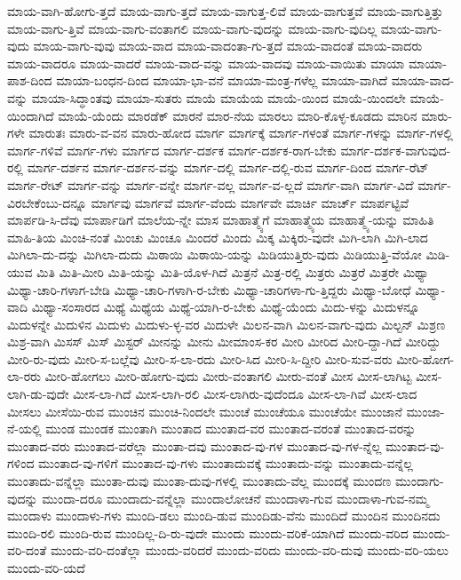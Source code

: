 {ಮಾಯ-ವಾಗಿ-ಹೋಗು-ತ್ತದೆ
ಮಾಯ-ವಾಗು-ತ್ತದೆ
ಮಾಯ-ವಾಗುತ್ತ-ಲಿವೆ
ಮಾಯ-ವಾಗುತ್ತವೆ
ಮಾಯ-ವಾಗುತ್ತಿತ್ತು
ಮಾಯ-ವಾಗು-ತ್ತಿವೆ
ಮಾಯ-ವಾಗು-ವಂತಾಗಲಿ
ಮಾಯ-ವಾಗು-ವುದನ್ನು
ಮಾಯ-ವಾಗು-ವುದಿಲ್ಲ
ಮಾಯ-ವಾಗು-ವುದು
ಮಾಯ-ವಾಗು-ವುವು
ಮಾಯ-ವಾದ
ಮಾಯ-ವಾದಂತಾ-ಗು-ತ್ತದೆ
ಮಾಯ-ವಾದಂತೆ
ಮಾಯ-ವಾದರು
ಮಾಯ-ವಾದರೂ
ಮಾಯ-ವಾದರೆ
ಮಾಯ-ವಾದ-ವನ್ನು
ಮಾಯ-ವಾದವು
ಮಾಯ-ವಾಯಿತು
ಮಾಯಾ
ಮಾಯಾ-ಪಾಶ-ದಿಂದ
ಮಾಯಾ-ಬಂಧನ-ದಿಂದ
ಮಾಯಾ-ಭಾ-ವನೆ
ಮಾಯಾ-ಮಂತ್ರ-ಗಳೆಲ್ಲ
ಮಾಯಾ-ವಾಗಿದೆ
ಮಾಯಾ-ವಾದ-ವನ್ನು
ಮಾಯಾ-ಸಿದ್ಧಾಂತವು
ಮಾಯಾ-ಸುತರು
ಮಾಯೆ
ಮಾಯೆಯ
ಮಾಯೆ-ಯಿಂದ
ಮಾಯೆ-ಯಿಂದಲೇ
ಮಾಯೆ-ಯಿಂದಾಗಿದೆ
ಮಾಯೆ-ಯೆಂದು
ಮಾರಡೆಕ್
ಮಾರನೆ
ಮಾರ-ನೆಯ
ಮಾರಲು
ಮಾರಿ-ಕೊಳ್ಳ-ಕೂಡದು
ಮಾರಿನ
ಮಾರು-ಗಳೇ
ಮಾರುತಃ
ಮಾರು-ವ-ವನ
ಮಾರು-ಹೋದ
ಮಾರ್ಗ
ಮಾರ್ಗಕ್ಕೆ
ಮಾರ್ಗ-ಗಳಂತೆ
ಮಾರ್ಗ-ಗಳನ್ನು
ಮಾರ್ಗ-ಗಳಲ್ಲಿ
ಮಾರ್ಗ-ಗಳಿವೆ
ಮಾರ್ಗ-ಗಳು
ಮಾರ್ಗದ
ಮಾರ್ಗ-ದರ್ಶಕ
ಮಾರ್ಗ-ದರ್ಶಕ-ರಾಗ-ಬೇಕು
ಮಾರ್ಗ-ದರ್ಶಕ-ವಾಗುವುದ-ರಲ್ಲಿ
ಮಾರ್ಗ-ದರ್ಶನ
ಮಾರ್ಗ-ದರ್ಶನ-ವನ್ನು
ಮಾರ್ಗ-ದಲ್ಲಿ
ಮಾರ್ಗ-ದಲ್ಲಿ-ರುವ
ಮಾರ್ಗ-ದಿಂದ
ಮಾರ್ಗ-ರೆಟ್
ಮಾರ್ಗ-ರೇಟ್
ಮಾರ್ಗ-ವನ್ನು
ಮಾರ್ಗ-ವನ್ನೇ
ಮಾರ್ಗ-ವಲ್ಲ
ಮಾರ್ಗ-ವ-ಲ್ಲದೆ
ಮಾರ್ಗ-ವಾಗಿ
ಮಾರ್ಗ-ವಿದೆ
ಮಾರ್ಗ-ವಿರಬೇಕೆಂಬು-ದನ್ನೂ
ಮಾರ್ಗವು
ಮಾರ್ಗವೆ
ಮಾರ್ಗ-ವೆಂದು
ಮಾರ್ಗವೇ
ಮಾರ್ಚಿ
ಮಾರ್ಚ್
ಮಾರ್ಪಟ್ಟಿವೆ
ಮಾರ್ಪಡಿ-ಸಿ-ದೆವು
ಮಾರ್ಪಾಡಿಗೆ
ಮಾಲೆಯ-ನ್ನೇ
ಮಾಸ
ಮಾಹಾತ್ಮ್ಯೆಗೆ
ಮಾಹಾತ್ಮ್ಯೆಯ
ಮಾಹಾತ್ಮ್ಯೆ-ಯನ್ನು
ಮಾಹಿತಿ
ಮಾಹಿ-ತಿಯ
ಮಿಂಚಿ-ನಂತೆ
ಮಿಂಚು
ಮಿಂಚೂ
ಮಿಂದರೆ
ಮಿಂದು
ಮಿಕ್ಕ
ಮಿಕ್ಕಿರು-ವುದೇ
ಮಿಗಿ-ಲಾಗಿ
ಮಿಗಿ-ಲಾದ
ಮಿಗಿಲಾ-ದು-ದನ್ನು
ಮಿಗಿಲಾ-ದುದು
ಮಿಠಾಯಿ
ಮಿಠಾಯಿ-ಯನ್ನು
ಮಿಡಿಯುತ್ತಿರು-ವುದು
ಮಿಡಿಯುತ್ತಿ-ವೆಯೋ
ಮಿಡಿ-ಯುವ
ಮಿತಿ
ಮಿತಿ-ಮೀರಿ
ಮಿತಿ-ಯನ್ನು
ಮಿತಿ-ಯೊಳ-ಗಿದೆ
ಮಿತ್ರನೆ
ಮಿತ್ರ-ರಲ್ಲಿ
ಮಿತ್ರರು
ಮಿತ್ರರೆ
ಮಿತ್ರರೇ
ಮಿಥ್ಯಾ
ಮಿಥ್ಯಾ-ಚಾರಿ-ಗಳಾಗ-ಬೇಡಿ
ಮಿಥ್ಯಾ-ಚಾರಿ-ಗಳಾಗಿ-ರ-ಬೇಕು
ಮಿಥ್ಯಾ-ಚಾರಿಗಳಾ-ಗು-ತ್ತಿದ್ದರು
ಮಿಥ್ಯಾ-ಬೋಧೆ
ಮಿಥ್ಯಾ-ವಾದಿ
ಮಿಥ್ಯಾ-ಸಂಸಾರದ
ಮಿಥ್ಯೆ
ಮಿಥ್ಯೆಯ
ಮಿಥ್ಯೆ-ಯಾಗಿ-ರ-ಬೇಕು
ಮಿಥ್ಯೆ-ಯೆಂದು
ಮಿದು-ಳನ್ನು
ಮಿದುಳನ್ನೂ
ಮಿದುಳನ್ನೇ
ಮಿದುಳಿನ
ಮಿದುಳು
ಮಿದುಳು-ಳ್ಳ-ವರ
ಮಿದುಳೇ
ಮಿಲನ-ವಾಗಿ
ಮಿಲನ-ವಾಗು-ವುದು
ಮಿಲ್ಟನ್
ಮಿಶ್ರಣ
ಮಿಶ್ರ-ವಾಗಿ
ಮಿಸಸ್
ಮಿಸ್
ಮಿಸ್ಟರ್
ಮೀನನ್ನು
ಮೀನು
ಮೀಮಾಂಸ-ಕರ
ಮೀರಿ
ಮೀರಿದ
ಮೀರಿ-ದ್ದಾ-ಗಿದೆ
ಮೀರಿದ್ದು
ಮೀರಿ-ರು-ವುದು
ಮೀರಿ-ಸ-ಬಲ್ಲೆವು
ಮೀರಿ-ಸ-ಲಾ-ರದು
ಮೀರಿ-ಸಿದ
ಮೀರಿ-ಸಿ-ದ್ದೀರಿ
ಮೀರಿ-ಸುವ-ವರು
ಮೀರಿ-ಹೋಗ-ಲಾ-ರರು
ಮೀರಿ-ಹೋಗಲು
ಮೀರಿ-ಹೋಗು-ವುದು
ಮೀರು-ವಂತಾಗಲಿ
ಮೀರು-ವಂತೆ
ಮೀಸ
ಮೀಸ-ಲಾಗಿಟ್ಟ
ಮೀಸ-ಲಾಗಿ-ಡು-ವುದೇ
ಮೀಸ-ಲಾ-ಗಿದೆ
ಮೀಸ-ಲಾಗಿ-ರಲಿ
ಮೀಸ-ಲಾಗಿರು-ವುದೆಂದೂ
ಮೀಸ-ಲಾ-ಗಿವೆ
ಮೀಸ-ಲಾದ
ಮೀಸಲು
ಮೀಸೆಯಿ-ರುವ
ಮುಂಚಿನ
ಮುಂಚಿ-ನಿಂದಲೇ
ಮುಂಚೆ
ಮುಂಚೆಯೂ
ಮುಂಚೆಯೇ
ಮುಂಜಾನೆ
ಮುಂಜಾ-ನೆ-ಯಲ್ಲಿ
ಮುಂಡ
ಮುಂಡಕ
ಮುಂತಾಗಿ
ಮುಂತಾದ
ಮುಂತಾದ-ವರ
ಮುಂತಾದ-ವರಂತೆ
ಮುಂತಾದ-ವರನ್ನು
ಮುಂತಾದ-ವರು
ಮುಂತಾದ-ವರೆಲ್ಲಾ
ಮುಂತಾ-ದವು
ಮುಂತಾದ-ವು-ಗಳ
ಮುಂತಾದ-ವು-ಗಳ-ನ್ನೆಲ್ಲ
ಮುಂತಾದ-ವು-ಗಳಿಂದ
ಮುಂತಾದ-ವು-ಗಳಿಗೆ
ಮುಂತಾದ-ವು-ಗಳು
ಮುಂತಾದುವಕ್ಕೆ
ಮುಂತಾದು-ವನ್ನು
ಮುಂತಾದು-ವನ್ನೆಲ್ಲ
ಮುಂತಾದು-ವನ್ನೆಲ್ಲಾ
ಮುಂತಾ-ದುವು
ಮುಂತಾ-ದುವು-ಗಳಲ್ಲಿ
ಮುಂತಾದು-ವೆಲ್ಲ
ಮುಂದಕ್ಕೆ
ಮುಂದಣ
ಮುಂದಾಗು-ವುದನ್ನು
ಮುಂದಾ-ದರೂ
ಮುಂದಾದು-ವನ್ನೆಲ್ಲಾ
ಮುಂದಾಲೋಚನೆ
ಮುಂದಾಳಾ-ಗುವ
ಮುಂದಾಳಾ-ಗುವ-ನಮ್ಮ
ಮುಂದಾಳು
ಮುಂದಾಳು-ಗಳು
ಮುಂದಿ-ಡಲು
ಮುಂದಿ-ಡುವ
ಮುಂದಿಡು-ವೆನು
ಮುಂದಿದೆ
ಮುಂದಿನ
ಮುಂದಿನದು
ಮುಂದಿ-ರಲಿ
ಮುಂದಿ-ರುವ
ಮುಂದಿಲ್ಲ-ದಿ-ರು-ವುದೇ
ಮುಂದು
ಮುಂದು-ವರಿಕೆ-ಯಾಗಿದೆ
ಮುಂದು-ವರಿದ
ಮುಂದು-ವರಿ-ದಂತೆ
ಮುಂದು-ವರಿ-ದಂತೆಲ್ಲಾ
ಮುಂದು-ವರಿದರೆ
ಮುಂದು-ವರಿದು
ಮುಂದು-ವರಿ-ದುವು
ಮುಂದು-ವರಿ-ಯಲು
ಮುಂದು-ವರಿ-ಯದೆ
}
